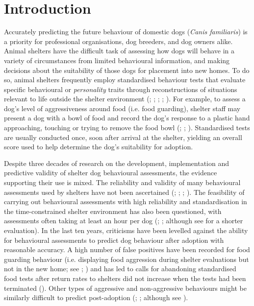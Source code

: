 \documentclass[12pt]{article}
\begin{document}
\section{Introduction}
Accurately predicting the future behaviour of domestic dogs (\textit{Canis familiaris}) is a priority for professional organisations, dog breeders, and dog owners alike. Animal shelters have the difficult task of assessing how dogs will behave in a variety of circumstances from limited behavioural information, and making decisions about the suitability of those dogs for placement into new homes. To do so, animal shelters frequently employ standardised behaviour tests that evaluate specific behavioural or \textit{personality} traits through reconstructions of situations relevant to life outside the shelter environment (\cite{vanderborg1991}; \cite{marston2003}; \cite{mornement2010}; \cite{taylor2006}; \cite{rayment2015}). For example, to assess a dog's level of aggressiveness around food (i.e. food guarding), shelter staff may present a dog with a bowl of food and record the dog's response to a plastic hand approaching, touching or trying to remove the food bowl (\cite{mohangibbons2012}; \cite{mohangibbons2018}; \cite{marder2013}). Standardised tests are usually conducted once, soon after arrival at the shelter, yielding an overall score used to help determine the dog's suitability for adoption.

Despite three decades of research on the development, implementation and predictive validity of shelter dog behavioural assessments, the evidence supporting their use is mixed. The reliability and validity of many behavioural assessments used by shelters have not been ascertained (\cite{taylor2006}; \cite{mornement2009}; \cite{mornement2010}; \cite{mornement2014}). The feasibility of carrying out behavioural assessments with high reliability and standardisation in the time-constrained shelter environment has also been questioned, with assessments often taking at least an hour per dog (\cite{vanderborg1991}; \cite{mornement2009}; although see \textcite{poulsen2010} for a shorter evaluation). In the last ten years, criticisms have been levelled against the ability for behavioural assessments to predict dog behaviour after adoption with reasonable accuracy. A high number of false positives have been recorded for food guarding behaviour (i.e. displaying food aggression during shelter evaluations but not in the new home; see \cite{mohangibbons2012}; \cite{marder2013}) and has led to calls for abandoning standardised food tests after return rates to shelters did not increase when the tests had been terminated (\cite{mohangibbons2018}). Other types of aggressive and non-aggressive behaviours might be similarly difficult to predict post-adoption (\cite{christensen2007}; \cite{mornement2015}; although see \textcite{bollen2008}).
\end{document}
